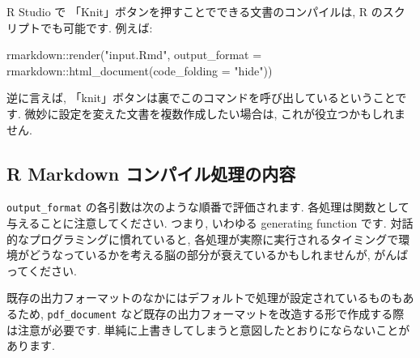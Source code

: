 \documentclass[
]{bxjsarticle}
\newenvironment{Shaded}{\begin{snugshade}}{\end{snugshade}}
\newcommand{\AttributeTok}[1]{\textcolor[rgb]{0.77,0.63,0.00}{#1}}
\newcommand{\FunctionTok}[1]{\textcolor[rgb]{0.00,0.00,0.00}{#1}}
\newcommand{\NormalTok}[1]{#1}
\newcommand{\SpecialCharTok}[1]{\textcolor[rgb]{0.00,0.00,0.00}{#1}}
\newcommand{\StringTok}[1]{\textcolor[rgb]{0.31,0.60,0.02}{#1}}
\begin{document}
R Studio で 「Knit」ボタンを押すことでできる文書のコンパイルは, R のスクリプトでも可能です. 例えば:

\begin{Shaded}
\begin{Highlighting}[numbers=left,,]
\NormalTok{rmarkdown}\SpecialCharTok{::}\FunctionTok{render}\NormalTok{(}\StringTok{"input.Rmd"}\NormalTok{, }\AttributeTok{output\_format =}\NormalTok{ rmarkdown}\SpecialCharTok{::}\FunctionTok{html\_document}\NormalTok{(}\AttributeTok{code\_folding =} \StringTok{"hide"}\NormalTok{))}
\end{Highlighting}
\end{Shaded}

逆に言えば, 「knit」ボタンは裏でこのコマンドを呼び出しているということです. 微妙に設定を変えた文書を複数作成したい場合は, これが役立つかもしれません.

\hypertarget{r-markdown-ux30b3ux30f3ux30d1ux30a4ux30ebux51e6ux7406ux306eux5185ux5bb9}{%
\subsection{R Markdown コンパイル処理の内容}\label{r-markdown-ux30b3ux30f3ux30d1ux30a4ux30ebux51e6ux7406ux306eux5185ux5bb9}}

\texttt{output\_format} の各引数は次のような順番で評価されます. 各処理は関数として与えることに注意してください. つまり, いわゆる generating function です. 対話的なプログラミングに慣れていると, 各処理が実際に実行されるタイミングで環境がどうなっているかを考える脳の部分が衰えているかもしれませんが, がんばってください.

既存の出力フォーマットのなかにはデフォルトで処理が設定されているものもあるため, \texttt{pdf\_document} など既存の出力フォーマットを改造する形で作成する際は注意が必要です. 単純に上書きしてしまうと意図したとおりにならないことがあります.
\end{document}
